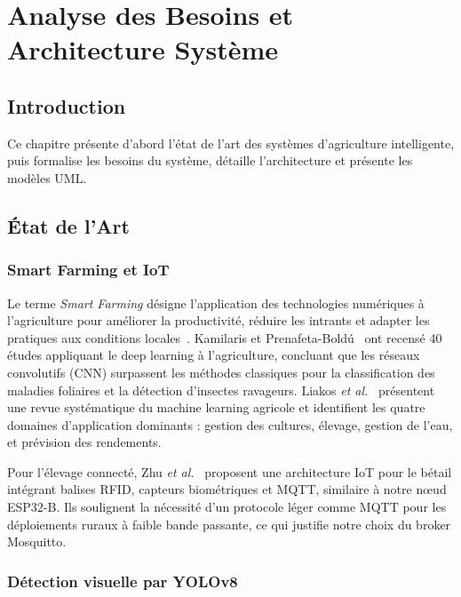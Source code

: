 \chapter{Analyse des Besoins et Architecture Système}
\section*{Introduction}
Ce chapitre présente d'abord l'état de l'art des systèmes d'agriculture
intelligente, puis formalise les besoins du système, détaille l'architecture
et présente les modèles UML.

\section{État de l'Art}

\subsection{Smart Farming et IoT}

Le terme \textit{Smart Farming} désigne l'application des technologies
numériques à l'agriculture pour améliorer la productivité, réduire les
intrants et adapter les pratiques aux conditions locales~\cite{sharma2024smart}.
Kamilaris et Prenafeta-Boldú~\cite{kamilaris2018} ont recensé 40 études
appliquant le deep learning à l'agriculture, concluant que les réseaux
convolutifs (CNN) surpassent les méthodes classiques pour la classification
des maladies foliaires et la détection d'insectes ravageurs. Liakos
\textit{et al.}~\cite{liakos2018} présentent une revue systématique du
machine learning agricole et identifient les quatre domaines d'application
dominants : gestion des cultures, élevage, gestion de l'eau, et prévision
des rendements.

Pour l'élevage connecté, Zhu \textit{et al.}~\cite{zhuvit2023iot} proposent
une architecture IoT pour le bétail intégrant balises RFID, capteurs
biométriques et MQTT, similaire à notre nœud ESP32-B. Ils soulignent la
nécessité d'un protocole léger comme MQTT pour les déploiements ruraux à
faible bande passante, ce qui justifie notre choix du broker Mosquitto.

\subsection{Détection visuelle par YOLOv8}

